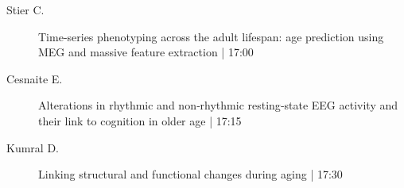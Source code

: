 \begin{symposium}
\begin{description}
                \item [ Stier C.] Time-series phenotyping across the adult lifespan: age prediction using MEG and massive feature extraction \textcolor{mygray}{ | 17:00}    
                
                \item [ Cesnaite E.] Alterations in rhythmic and non‐rhythmic resting‐state EEG activity and their link to cognition in older age \textcolor{mygray}{ | 17:15}    
                
                \item [ Kumral D.] Linking structural and functional changes during aging \textcolor{mygray}{ | 17:30}    
                
            \end{description} 
            \end{symposium}
            